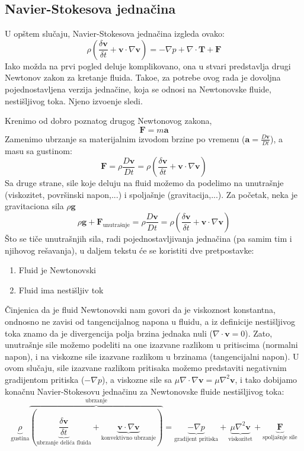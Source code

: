 \documentclass[12pt]{article}
\renewcommand{\vec}[1]{\boldsymbol{#1}}
\begin{document}
    \subsection{Navier-Stokesova jedna\v cina}
        U op\v stem slu\v caju, Navier-Stokesova jedna\v cina izgleda ovako:
        $$ \rho(\frac{\delta \vec{v}}{\delta t} + \vec{v} \cdot \nabla \vec{v}) = -\nabla p + \nabla \cdot \vec{T} + \vec{F} $$
        Iako mo\v zda na prvi pogled deluje komplikovano, ona u stvari predstavlja drugi Newtonov zakon za kretanje fluida. Tako\dj e, za potrebe ovog rada je dovoljna pojednostavljena verzija jedna\v cine, koja se odnosi na Newtonovske fluide, nesti\v sljivog toka. Njeno izvo\dj enje sledi.

        Krenimo od dobro poznatog drugog Newtonovog zakona,
            $$\vec{F}=m\vec{a}$$
        Zamenimo ubrzanje sa materijalnim izvodom brzine po vremenu ($\vec{a} = \frac{D\vec{v}}{Dt}$), a masu sa gustinom:
            $$\vec{F}=\rho\frac{D\vec{v}}{Dt}=\rho(\frac{\delta \vec{v}}{\delta t} + \vec{v} \cdot \nabla \vec{v})$$
        Sa druge strane, sile koje deluju na fluid mo\v zemo da podelimo na unutra\v snje (viskozitet, povr\v sinski napon,...) i spolja\v snje (gravitacija,...). Za po\v cetak, neka je gravitaciona sila $\rho \vec{g}$
        $$\rho \vec{g} + \vec{F}_{\text{unutra\v snje}}=\rho\frac{D\vec{v}}{Dt}=\rho(\frac{\delta \vec{v}}{\delta t} + \vec{v} \cdot \nabla \vec{v})$$
        \v Sto se ti\v ce unutra\v snjih sila, radi pojednostavljivanja jedna\v cina (pa samim tim i njihovog re\v savanja), u daljem tekstu \'ce se koristiti dve pretpostavke:
        \begin{enumerate}
          \item Fluid je Newtonovski
          \item Fluid ima nesti\v sljiv tok
        \end{enumerate}
        \v Cinjenica da je fluid Newtonovski nam govori da je viskoznost konstantna, ondnosno ne zavisi od tangencijalnog napona u fluidu, a iz definicije nesti\v sljivog toka znamo da je divergencija polja brzina jednaka nuli ($\nabla \cdot \vec v = 0$). Zato, unutra\v snje sile mo\v zemo podeliti na one izazvane razlikom u pritiscima (normalni napon), i na viskozne sile izazvane razlikom u brzinama (tangencijalni napon)\cite{particle-fluids}. U ovom slu\v caju, sile izazvane razlikom pritisaka mo\v zemo predstaviti negativnim gradijentom pritiska ($-\nabla p$), a viskozne sile sa $\mu\nabla\cdot\nabla\vec{v}=\mu\nabla^2\vec{v}$, i tako dobijamo kona\v cnu Navier-Stokesovu jedna\v cinu za Newtonovske fluide nesti\v sljivog toka:
        $$ \underbrace{\rho}_{\text{gustina}} \overbrace{(\underbrace{\frac{\delta \vec{v}}{\delta t}}_{\text{ubrzanje deli\'ca fluida}} + \underbrace{\vec{v} \cdot \nabla \vec{v}}_{\text{konvektivno ubrzanje}})}^{\text{ubrzanje}} = \underbrace{-\nabla p}_{\text{gradijent pritiska}} + \underbrace{\mu\nabla^2\vec{v}}_{\text{viskozitet}} + \underbrace{\vec{F}}_{\text{spolja\v snje sile}} $$
\end{document}
